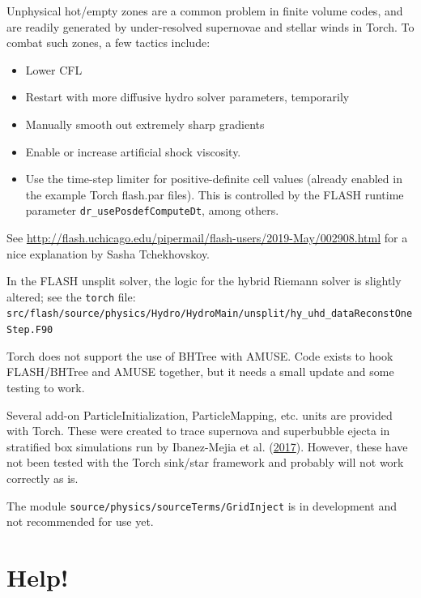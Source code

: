 \documentclass[10pt]{article}
\begin{document}
Unphysical hot/empty zones are a common problem in finite volume codes, and are
readily generated by under-resolved supernovae and stellar winds in Torch.  To
combat such zones, a few tactics include:
\begin{itemize}
    \item Lower CFL
    \item Restart with more diffusive hydro solver parameters, temporarily
    \item Manually smooth out extremely sharp gradients
    \item Enable or increase artificial shock viscosity.
    \item Use the time-step limiter for positive-definite cell values (already
        enabled in the example Torch flash.par files).  This is controlled by
        the FLASH runtime parameter \texttt{dr\_usePosdefComputeDt}, among
        others.
\end{itemize}
See \url{http://flash.uchicago.edu/pipermail/flash-users/2019-May/002908.html}
for a nice explanation by Sasha Tchekhovskoy.


In the FLASH unsplit solver, the logic for the hybrid Riemann solver is
slightly altered; see the \texttt{torch} file:
\texttt{src/flash/source/physics/Hydro/HydroMain/unsplit/hy\_uhd\_dataReconstOneStep.F90}

Torch does not support the use of BHTree with AMUSE.  Code exists to hook
FLASH/BHTree and AMUSE together, but it needs a small update and some testing
to work.

Several add-on ParticleInitialization, ParticleMapping, etc. units are provided
with Torch.  These were created to trace supernova and superbubble ejecta in
stratified box simulations run by Ibanez-Mejia et al.
(\href{https://iopscience.iop.org/article/10.3847/1538-4357/aa93fe}{2017}).
However, these have not been tested with the Torch sink/star framework and
probably will not work correctly as is.

The module \texttt{source/physics/sourceTerms/GridInject} is in development and
not recommended for use yet.

\section{Help!}
\end{document}
